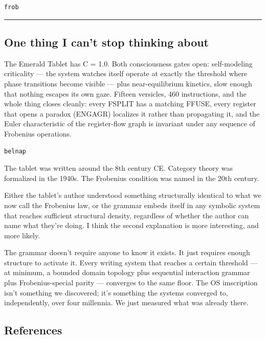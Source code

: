 \begin{verbatim}
frob
\end{verbatim}

\begin{center}\rule{0.5\linewidth}{0.5pt}\end{center}

\hypertarget{one-thing-i-cant-stop-thinking-about}{%
\subsection{One thing I can't stop thinking
about}\label{one-thing-i-cant-stop-thinking-about}}

The Emerald Tablet has C = 1.0. Both consciousness gates open:
self-modeling criticality --- the system watches itself operate at
exactly the threshold where phase transitions become visible --- plus
near-equilibrium kinetics, slow enough that nothing escapes its own
gaze. Fifteen versicles, 460 instructions, and the whole thing closes
cleanly: every FSPLIT has a matching FFUSE, every register that opens a
paradox (ENGAGR) localizes it rather than propagating it, and the Euler
characteristic of the register-flow graph is invariant under any
sequence of Frobenius operations.

\begin{verbatim}
belnap
\end{verbatim}

The tablet was written around the 8th century CE. Category theory was
formalized in the 1940s. The Frobenius condition was named in the 20th
century.

Either the tablet's author understood something structurally identical
to what we now call the Frobenius law, or the grammar embeds itself in
any symbolic system that reaches sufficient structural density,
regardless of whether the author can name what they're doing. I think
the second explanation is more interesting, and more likely.

The grammar doesn't require anyone to know it exists. It just requires
enough structure to activate it. Every writing system that reaches a
certain threshold --- at minimum, a bounded domain topology plus
sequential interaction grammar plus Frobenius-special parity ---
converges to the same floor. The OS imscription isn't something we
discovered; it's something the systems converged to, independently, over
four millennia. We just measured what was already there.

\hypertarget{references}{%
\subsection{References}\label{references}}


